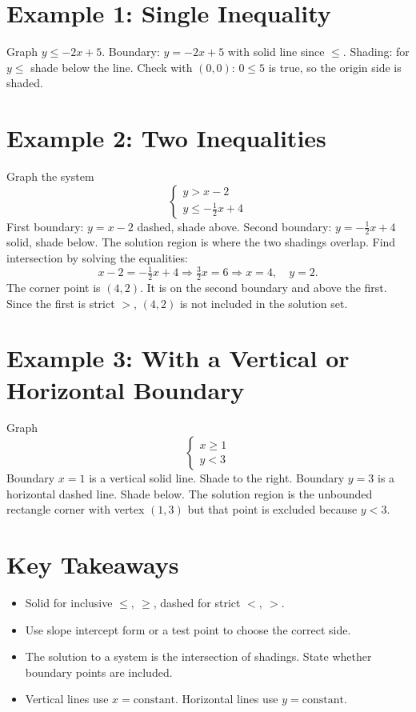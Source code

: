\documentclass[12pt]{article}
\begin{document}
\section*{Example 1: Single Inequality}

Graph \(y \le -2x + 5\).  
Boundary: \(y = -2x + 5\) with solid line since \(\le\).  
Shading: for \(y \le\) shade below the line.  
Check with \((0,0)\): \(0 \le 5\) is true, so the origin side is shaded.

\section*{Example 2: Two Inequalities}

Graph the system
\[
\begin{cases}
y > x - 2\\
y \le -\tfrac{1}{2}x + 4
\end{cases}
\]
First boundary: \(y = x - 2\) dashed, shade above.  
Second boundary: \(y = -\tfrac{1}{2}x + 4\) solid, shade below.  
The solution region is where the two shadings overlap.  
Find intersection by solving the equalities:
\[
x - 2 = -\tfrac{1}{2}x + 4 \Rightarrow \tfrac{3}{2}x = 6 \Rightarrow x = 4,\quad y = 2.
\]
The corner point is \((4,2)\). It is on the second boundary and above the first. Since the first is strict \(>\), \((4,2)\) is not included in the solution set.

\section*{Example 3: With a Vertical or Horizontal Boundary}

Graph
\[
\begin{cases}
x \ge 1\\
y < 3
\end{cases}
\]
Boundary \(x=1\) is a vertical solid line. Shade to the right.  
Boundary \(y=3\) is a horizontal dashed line. Shade below.  
The solution region is the unbounded rectangle corner with vertex \((1,3)\) but that point is excluded because \(y<3\).

\section*{Key Takeaways}
\begin{itemize}
    \item Solid for inclusive \(\le,\ \ge\), dashed for strict \(<,\ >\).
    \item Use slope intercept form or a test point to choose the correct side.
    \item The solution to a system is the intersection of shadings. State whether boundary points are included.
    \item Vertical lines use \(x=\text{constant}\). Horizontal lines use \(y=\text{constant}\).
\end{itemize}
\end{document}
